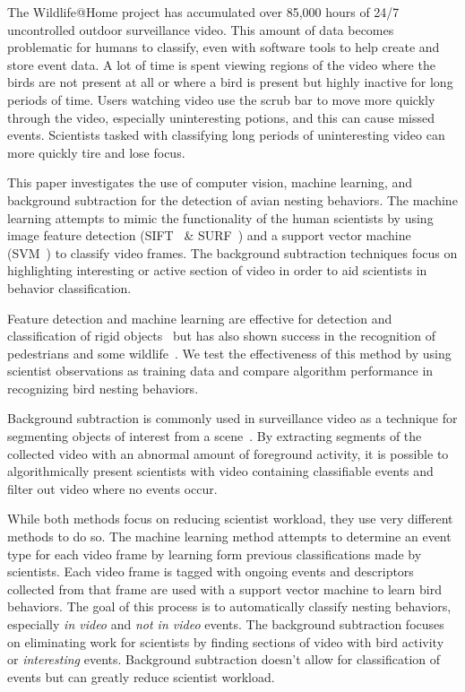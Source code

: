 The Wildlife@Home project has accumulated over 85,000 hours of 24/7 uncontrolled outdoor surveillance video. This amount of data becomes problematic for humans to classify, even with software tools to help create and store event data. A lot of time is spent viewing regions of the video where the birds are not present at all or where a bird is present but highly inactive for long periods of time. Users watching video use the scrub bar to move more quickly through the video, especially uninteresting potions, and this can cause missed events. Scientists tasked with classifying long periods of uninteresting video can more quickly tire and lose focus.

This paper investigates the use of computer vision, machine learning, and background subtraction for the detection of avian nesting behaviors. The machine learning attempts to mimic the functionality of the human scientists by using image feature detection (SIFT~\cite{lowe_1999_object} \& SURF~\cite{bay_2006_surf}) and a support vector machine (SVM~\cite{burges_1998_tutorial, carpenter_2009_cusvm, chang_2007_psvm, chang_2011_libsvm}) to classify video frames. The background subtraction techniques focus on highlighting interesting or active section of video in order to aid scientists in behavior classification.

Feature detection and machine learning are effective for detection and classification of rigid objects~\cite{faro_2011_adaptive} but has also shown success in the recognition of pedestrians and some wildlife~\cite{heikkila_2004_real, dalal_2005_histograms, fan_2013_pedestrian,oren_1997_pedestrian, boom_2012_long}. We test the effectiveness of this method by using scientist observations as training data and compare algorithm performance in recognizing bird nesting behaviors.

Background subtraction is commonly used in surveillance video as a technique for segmenting objects of interest from a scene~\cite{mcivor_2000_background, piccardi_2004_background}. By extracting segments of the collected video with an abnormal amount of foreground activity, it is possible to algorithmically present scientists with video containing classifiable events and filter out video where no events occur.

While both methods focus on reducing scientist workload, they use very different methods to do so. The machine learning method attempts to determine an event type for each video frame by learning form previous classifications made by scientists. Each video frame is tagged with ongoing events and descriptors collected from that frame are used with a support vector machine to learn bird behaviors. The goal of this process is to automatically classify nesting behaviors, especially \emph{in video} and \emph{not in video} events. The background subtraction focuses on eliminating work for scientists by finding sections of video with bird activity or \emph{interesting} events. Background subtraction doesn't allow for classification of events but can greatly reduce scientist workload.

